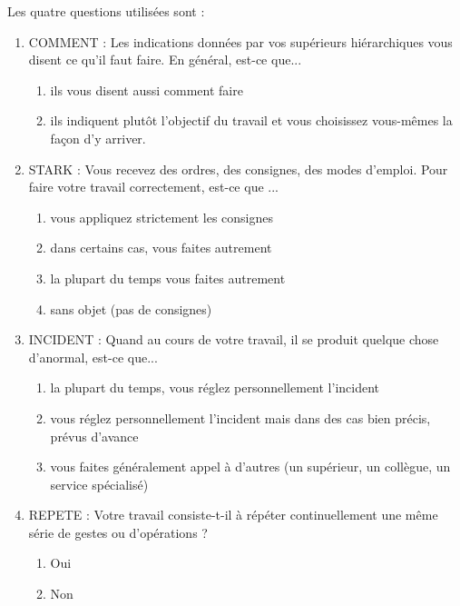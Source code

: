 \documentclass[11pt,fleqn,a4paper,openany,frenchb]{book} %
\begin{document}
Les quatre questions utilisées sont : 
\begin{enumerate}
\item COMMENT : Les indications données par vos supérieurs hiérarchiques vous disent ce qu'il faut faire. En général, est-ce que...
    \begin{enumerate}
    \item ils vous disent aussi comment faire
    \item ils indiquent plutôt l'objectif du travail et vous choisissez vous-mêmes la façon d'y arriver.
    \end{enumerate}
\item STARK : Vous recevez des ordres, des consignes, des modes d'emploi. Pour faire votre travail correctement, est-ce que ...
    \begin{enumerate}
    \item  vous appliquez strictement les consignes
    \item dans certains cas, vous faites autrement
    \item la plupart du temps vous faites autrement
    \item sans objet (pas de consignes)
    \end{enumerate}
\item INCIDENT : Quand au cours de votre travail, il se produit quelque chose d'anormal, est-ce que...
    \begin{enumerate}
    \item la plupart du temps, vous réglez personnellement l'incident
    \item vous réglez personnellement l’incident mais dans des cas bien précis, prévus
    d’avance
    \item vous faites généralement appel à d'autres (un supérieur, un collègue, un service
    spécialisé)
    \end{enumerate}
\item REPETE : Votre travail consiste-t-il à répéter continuellement une même série de gestes ou d'opérations ?
    \begin{enumerate}
    \item Oui
    \item Non
    \end{enumerate}
\end{enumerate}
\end{document}
